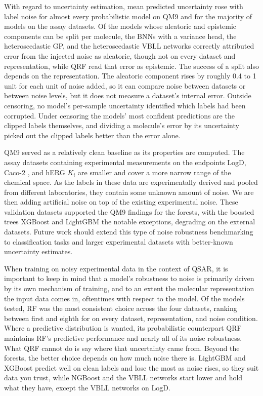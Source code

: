 With regard to uncertainty estimation, mean predicted uncertainty rose with label noise for almost every probabilistic model on QM9 and for the majority of models on the assay datasets. Of the models whose aleatoric and epistemic components can be split per molecule, the BNNs with a variance head, the heteroscedastic GP, and the heteroscedastic VBLL networks correctly attributed error from the injected noise as aleatoric, though not on every dataset and representation, while QRF read that error as epistemic. The success of a split also depends on the representation. The aleatoric component rises by roughly 0.4 to 1 unit for each unit of noise added, so it can compare noise between datasets or between noise levels, but it does not measure a dataset's internal error. Outside censoring, no model's per-sample uncertainty identified which labels had been corrupted. Under censoring the models' most confident predictions are the clipped labels themselves, and dividing a molecule's error by its uncertainty picked out the clipped labels better than the error alone.

QM9 served as a relatively clean baseline as its properties are computed. The assay datasets containing experimental measurements on the endpoints LogD, Caco-2 \citep{openadmet}, and hERG $K_i$ \citep{Zdrazil2023} are smaller and cover a more narrow range of the chemical space. As the labels in these data are experimentally derived and pooled from different laboratories, they contain some unknown amount of noise. We are then adding artificial noise on top of the existing experimental noise. These validation datasets supported the QM9 findings for the forests, with the boosted
trees XGBoost and LightGBM the notable exceptions, degrading on the external datasets. Future work should extend this type of noise robustness benchmarking to classification tasks and larger experimental datasets with better-known uncertainty estimates.

When training on noisy experimental data in the context of QSAR, it is important to keep in mind that a model's robustness to noise is primarily driven by its own mechanism of training, and to an extent the molecular representation the input data comes in, oftentimes with respect to the model. Of the models tested, RF was the most consistent choice across the four datasets, ranking between first and eighth for \aucnorm{} on every dataset, representation, and noise condition. Where a predictive distribution is wanted, its probabilistic counterpart QRF maintains RF's predictive performance and nearly all of its noise robustness. What QRF cannot do is say where that uncertainty came from. Beyond the forests, the better choice depends on how much noise there is. LightGBM and XGBoost predict well on clean labels and lose the most as noise rises, so they suit data you trust, while NGBoost and the VBLL networks start lower and hold what they have, except the VBLL networks on LogD.

